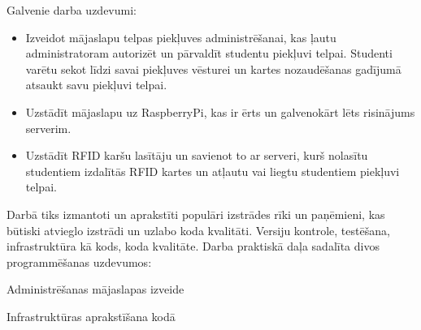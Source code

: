 Galvenie darba uzdevumi:
\begin{itemize}
  \item Izveidot mājaslapu telpas piekļuves administrēšanai, kas ļautu administratoram autorizēt un pārvaldīt studentu piekļuvi telpai. Studenti varētu sekot līdzi savai piekļuves vēsturei un kartes nozaudēšanas gadījumā atsaukt savu piekļuvi telpai.
  \item Uzstādīt mājaslapu uz RaspberryPi, kas ir ērts un galvenokārt lēts risinājums serverim.
  \item Uzstādīt RFID karšu lasītāju un savienot to ar serveri, kurš nolasītu studentiem izdalītās RFID kartes un atļautu vai liegtu studentiem piekļuvi telpai.
\end{itemize}

Darbā tiks izmantoti un aprakstīti populāri izstrādes rīki un paņēmieni, kas būtiski atvieglo izstrādi un uzlabo koda kvalitāti.
Versiju kontrole, testēšana, infrastruktūra kā kods, koda kvalitāte.
Darba praktiskā daļa sadalīta divos programmēšanas uzdevumos:
\begin{env}
  \item Administrēšanas mājaslapas izveide
  \item Infrastruktūras aprakstīšana kodā
\end{env}


